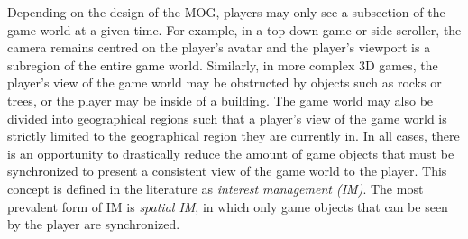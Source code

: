Depending on the design of the MOG, players may only see a subsection of the game world at a given time. For example, in a top-down game or side scroller, the camera remains centred on the player's avatar and the player's viewport is a subregion of the entire game world. Similarly, in more complex 3D games, the player's view of the game world may be obstructed by objects such as rocks or trees, or the player may be inside of a building. The game world may also be divided into geographical regions such that a player's view of the game world is strictly limited to the geographical region they are currently in. In all cases, there is an opportunity to drastically reduce the amount of game objects that must be synchronized to present a consistent view of the game world to the player. This concept is defined in the literature as \textit{interest management (IM)}\cite{im-thesis}. The most prevalent form of IM is \textit{spatial IM}, in which only game objects that can be seen by the player are synchronized.









